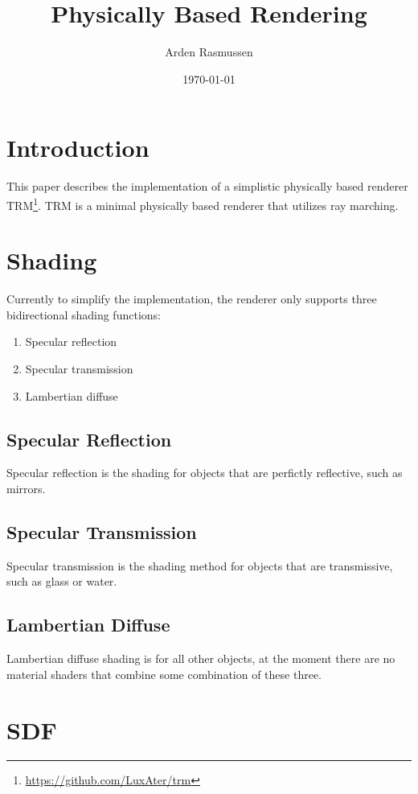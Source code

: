 \documentclass{amsart}
\title{Physically Based Rendering}
\author{Arden Rasmussen}
\date{\today}
\begin{document}
\maketitle

\section{Introduction}%
\label{sec:Introduction}

This paper describes the implementation of a simplistic physically based
renderer TRM\footnote{\url{https://github.com/LuxAter/trm}}. TRM is a minimal
physically based renderer that utilizes ray marching.


\section{Shading}%
\label{sec:Shading}

Currently to simplify the implementation, the renderer only supports three
bidirectional shading functions:
\begin{enumerate}
  \item Specular reflection
  \item Specular transmission
  \item Lambertian diffuse
\end{enumerate}

\subsection{Specular Reflection}%
\label{sub:Specular Reflection}
Specular reflection is the shading for objects that are perfictly reflective,
such as mirrors.

\subsection{Specular Transmission}%
\label{sub:Specular Transmission}
Specular transmission is the shading method for objects that are transmissive,
such as glass or water.

\subsection{Lambertian Diffuse}%
\label{sub:Lambertian Diffuse}
Lambertian diffuse shading is for all other objects, at the moment there are no
material shaders that combine some combination of these three.

\section{SDF}%
\label{sec:sdf}
\end{document}

